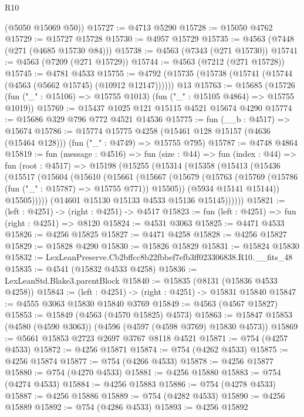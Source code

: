 \begin{lexlean}{R10}
\begin{coremodule}
      (@5050 @15069 @50))
@15727 := @4713 @5290
@15728 := @15050 @4762
@15729 := @15727 @15728
@15730 := @4957 @15729
@15735 := @4563 (@7448 (@271 (@4685 @15730 @84)))
@15738 := @4563 (@7343 (@271 @15730))
@15741 := @4563 (@7209 (@271 @15729))
@15744 := @4563 (@7212 (@271 @15728))
@15745 := @4781 @4533
@15755 := @4792 (@15735 (@15738 (@15741 (@15744 (@4563 (@5662 @15745) (@10912 @12147)))))) @13
@15763 := @15685
    (@15726 (fun ("_" : @15106) => @15755 @1013) (fun ("_" : @15105 @4864) => @15755 @1019))
@15769 := @15437 @1025 @121 @15115 @4521 @15674 @4290
@15774 := @15686 @329 @796 @772 @4521 @14536
@15775 := fun (__b : @4517) => @15674
@15786 := @15774
    @15775
    @4258
    (@15461 @128 @15157 (@4636 (@15464 @128)))
    (fun ("_" : @4749) => @15755 @795)
@15787 := @4748 @4864
@15819 := fun (message : @4516) =>
  fun (size : @44) =>
  fun (index : @44) =>
  fun (root : @4517) =>
  @15198
    (@15255
      (@15314
        (@15358
          (@15413
            (@15436
              (@15517
                (@15604
                  (@15610
                    (@15661
                      (@15667
                        (@15679
                          (@15763 (@15769 (@15786 (fun ("_" : @15787) => @15755 @771)) @15505))
                          (@5934 @15141 @15144))
                        @15505)))))
              (@14601 @15130 @15133 @4533 @15136 @15145))))))
@15821 := (left : @4251) -> (right : @4251) -> @4517
@15823 := fun (left : @4251) => fun (right : @4251) => @8120
@15824 := @4531 @3063
@15825 := @4471 @4533
@15826 := @4256 @15825
@15827 := @4471 @4258
@15828 := @4256 @15827
@15829 := @15828 @4290
@15830 := @15826 @15829
@15831 := @15824 @15830
@15832 := LexLeanPreserve.Cb2bffcc8b22fbbef7efb3ff023306838.R10.__fits_48
@15835 := @4541 (@15832 @4533 @4258)
@15836 := LexLeanStd.Blake3.parentBlock
@15840 := @15835 (@8131 (@15836 @4533 @4258))
@15843 := (left : @4251) -> (right : @4251) -> @15831 @15840
@15847 := @4555 @3063 @15830 @15840 @3769
@15849 := @4563 (@4567 @15827)
@15853 := @15849 (@4563 (@4570 @15825) @4573)
@15863 := @15847 @15853 (@4580 (@4590 @3063)) (@4596 (@4597 (@4598 @3769) @15830 @4573))
@15869 := @5661 @15853 @2723 @2697 @3767 @8118 @4521
@15871 := @754 (@4257 @4533)
@15872 := @4256 @15871
@15874 := @754 (@4262 @4533)
@15875 := @4256 @15874
@15877 := @754 (@4266 @4533)
@15878 := @4256 @15877
@15880 := @754 (@4270 @4533)
@15881 := @4256 @15880
@15883 := @754 (@4274 @4533)
@15884 := @4256 @15883
@15886 := @754 (@4278 @4533)
@15887 := @4256 @15886
@15889 := @754 (@4282 @4533)
@15890 := @4256 @15889
@15892 := @754 (@4286 @4533)
@15893 := @4256 @15892

\end{coremodule}
\end{lexlean}
